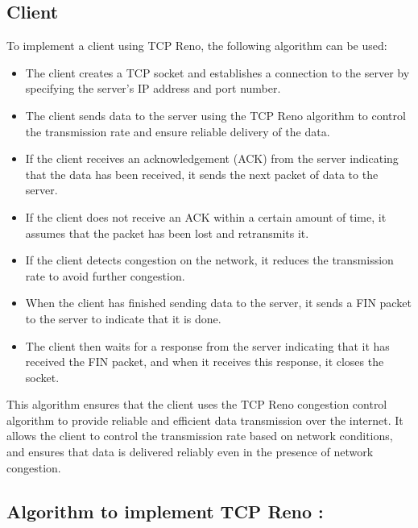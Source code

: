 \documentclass[11pt]{article}
\begin{document}
\subsection{Client}
To implement a client using TCP Reno, the following algorithm can be used:
\begin{itemize}
\item The client creates a TCP socket and establishes a connection to the server by specifying the server's IP address and port number.

\item The client sends data to the server using the TCP Reno algorithm to control the transmission rate and ensure reliable delivery of the data.

\item If the client receives an acknowledgement (ACK) from the server indicating that the data has been received, it sends the next packet of data to the server.

\item If the client does not receive an ACK within a certain amount of time, it assumes that the packet has been lost and retransmits it.

\item If the client detects congestion on the network, it reduces the transmission rate to avoid further congestion.

\item When the client has finished sending data to the server, it sends a FIN packet to the server to indicate that it is done.

\item The client then waits for a response from the server indicating that it has received the FIN packet, and when it receives this response, it closes the socket.
\end{itemize}
This algorithm ensures that the client uses the TCP Reno congestion control algorithm to provide reliable and efficient data transmission over the internet. It allows the client to control the transmission rate based on network conditions, and ensures that data is delivered reliably even in the presence of network congestion.


\subsection{Algorithm to implement TCP Reno : }
\end{document}
